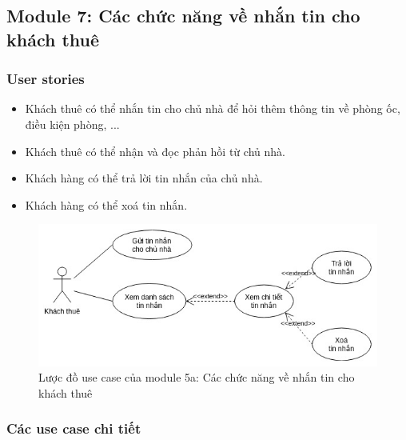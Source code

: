 \subsection{Module 7: Các chức năng về nhắn tin cho khách thuê}
\subsubsection{User stories}
\begin{itemize}
    \item Khách thuê có thể nhắn tin cho chủ nhà để hỏi thêm thông tin về phòng ốc, điều kiện phòng, ...
    \item Khách thuê có thể nhận và đọc phản hồi từ chủ nhà.
    \item Khách hàng có thể trả lời tin nhắn của chủ nhà.
    \item Khách hàng có thể xoá tin nhắn.
\end{itemize}

\begin{figure}[!h]
	\centering
	\includegraphics[width=\textwidth]{parts/Cuong/images/module5b.jpg}
	\caption{Lược đồ use case của module 5a: Các chức năng về nhắn tin cho khách thuê}
\end{figure}


\subsubsection{Các use case chi tiết}

